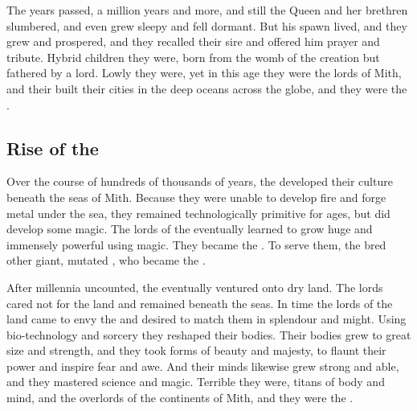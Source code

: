 The years passed, a million years and more, and still the \Kraken{} Queen and her brethren slumbered, and even \Moroch{} grew sleepy and fell dormant. But his spawn lived, and they grew and prospered, and they recalled their sire and offered him prayer and tribute. Hybrid children they were, born from the womb of the \voyagersz{} creation but fathered by a \kraken{} lord. Lowly they were, yet in this age they were the lords of Mith, and their built their cities in the deep oceans across the globe, and they were the \nagae{}. 

\subsection{Rise of the \Dragonlords}
\label{Origin of Dragons}
Over the course of hundreds of thousands of years, the \nagae{} developed their culture beneath the seas of Mith. Because they were unable to develop fire and forge metal under the sea, they remained technologically primitive for ages, but did develop some magic. The lords of the \nagae{} eventually learned to grow huge and immensely powerful using magic. They became the \leviathans{}. To serve them, the \leviathans{} bred other giant, mutated \nagae{}, who became the \linnorms. 


After millennia uncounted, the \nagae{} eventually ventured onto dry land. The \leviathan{} lords cared not for the land and remained beneath the seas. In time the \naga{} lords of the land came to envy the \leviathans{} and desired to match them in splendour and might. Using bio-technology and sorcery they reshaped their bodies. Their bodies grew to great size and strength, and they took forms of beauty and majesty, to flaunt their power and inspire fear and awe. And their minds likewise grew strong and able, and they mastered science and magic. Terrible they were, titans of body and mind, and the overlords of the continents of Mith, and they were the \dragons{}. 

